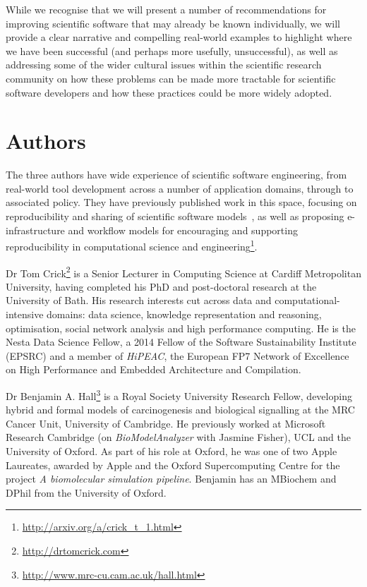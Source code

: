 \documentclass[a4paper,11pt]{article}
\begin{document}
While we recognise that we will present a number of recommendations
for improving scientific software that may already be known
individually, we will provide a clear narrative and compelling
real-world examples to highlight where we have been successful (and
perhaps more usefully, unsuccessful), as well as addressing some of
the wider cultural issues within the scientific research community on
how these problems can be made more tractable for scientific software
developers and how these practices could be more widely adopted.

\section*{Authors}

The three authors have wide experience of scientific software
engineering, from real-world tool development across a number of
application domains, through to associated policy. They have
previously published work in this space, focusing on reproducibility
and sharing of scientific software
models~\cite{crick-et-al_wssspe2,crick-et-al_recomp2014,crick-et-al_jors},
as well as proposing e-infrastructure and workflow models for
encouraging and supporting reproducibility in computational science
and engineering\footnote{\url{http://arxiv.org/a/crick_t_1.html}}.

Dr Tom Crick\footnote{\url{http://drtomcrick.com}} is a Senior
Lecturer in Computing Science at Cardiff Metropolitan University,
having completed his PhD and post-doctoral research at the University
of Bath. His research interests cut across data and
computational-intensive domains: data science, knowledge
representation and reasoning, optimisation, social network analysis
and high performance computing. He is the Nesta Data Science Fellow, a
2014 Fellow of the Software Sustainability Institute (EPSRC) and a
member of {\emph{HiPEAC}}, the European FP7 Network of Excellence on
High Performance and Embedded Architecture and Compilation.

Dr Benjamin
A. Hall\footnote{\url{http://www.mrc-cu.cam.ac.uk/hall.html}} is a
Royal Society University Research Fellow, developing hybrid and formal
models of carcinogenesis and biological signalling at the MRC Cancer
Unit, University of Cambridge. He previously worked at Microsoft
Research Cambridge (on {\emph{BioModelAnalyzer}} with Jasmine Fisher), UCL and
the University of Oxford. As part of his role at Oxford, he was one of
two Apple Laureates, awarded by Apple and the Oxford Supercomputing
Centre for the project {\emph{A biomolecular simulation
pipeline}}. Benjamin has an MBiochem and DPhil from the University of
Oxford.
\end{document}
